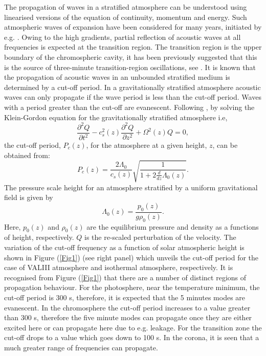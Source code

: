 \documentclass[preprint,authoryear,12pt]{elsarticle}
\begin{document}
The propagation of waves in a stratified atmosphere can be understood using linearised versions of the 
equation of continuity, momentum and energy. Such atmospheric waves of expansion have been 
considered for many years, initiated by e.g. \citet{Lamb1932}. Owing to the high gradients, partial 
reflection of acoustic waves at all frequencies is expected at the transition region. The transition region 
is the upper boundary of the chromospheric cavity, it has been previously suggested that this is the source 
of three-minute transition-region oscillations, see \citet{Leibacher1971}. It is known that the propagation of 
acoustic waves in an unbounded stratified medium is determined by a cut-off period. In a gravitationally 
stratified atmosphere acoustic waves can only propagate if the wave period is less than the cut-off period. 
Waves with a period greater than the cut-off are evanescent. Following \citet{Taroyan2008}, by solving the 
Klein-Gordon equation for the gravitationally stratified atmosphere i.e, 
$$
\frac{\partial^2 Q}{\partial t^2} - c_s^2(z) \frac{\partial^2 Q}{\partial z^2} + \Omega^2(z)Q = 0,
$$
the cut-off period, $P_{c}(z)$, for the atmosphere at a given height, $z$, can be obtained from:
$$
P_{c}(z)=\frac{2\Lambda_0   }{ c_{s}(z)}   \sqrt{\frac{1}{1+2\frac{d}{dz}\Lambda_0(z)}}.
$$
The pressure scale height for an atmosphere stratified by a uniform gravitational field is given by
$$
\Lambda_0(z)=\frac{p_0(z)}{g\rho_0(z)}.
$$
Here, $p_0(z)$ and $\rho_0(z)$ are the equilibrium pressure and density as a functions of height, respectively. $Q$ is the 
re-scaled perturbation of the velocity. The variation of the cut-off frequency as a function of solar atmospheric height is shown in 
Figure (\ref{Fig1}) (see right panel) which unveils the cut-off period for the case of VALIII atmosphere and isothermal 
atmosphere, respectively. It is recognised from Figure (\ref{Fig1}) that there are a number of distinct 
regions of propagation behaviour. For the photosphere, near the temperature minimum, the cut-off period is 300 s, therefore, 
it is expected that the 5 minutes modes are evanescent. In the chromosphere the cut-off period increases to a value greater than 300 s, 
therefore the five minute modes can propagate once they are either excited here or can propagate here due to e.g. leakage. For the transition zone the cut-off drops to a value which goes down to 100 s. In the corona, it is seen that a much greater range of frequencies can propagate.
\end{document}
